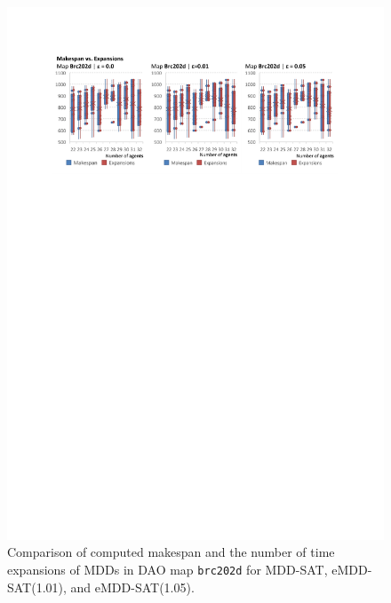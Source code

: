 \documentclass[jair,oneside,11pt]{article}
\begin{document}
\begin{figure}[h]
\centering
\includegraphics[trim={2.5cm 20.8cm 2.5cm 2.7cm},clip,width=1.0\textwidth]{expr_maps-make-expand_brc202d.pdf}
\vspace{-0.6cm}\caption{Comparison of computed makespan and the number of time expansions of MDDs in DAO map \texttt{brc202d} for MDD-SAT, eMDD-SAT(1.01), and eMDD-SAT(1.05).}
\label{figure-make-expand-maps_brc202d}
\end{figure}
\end{document}
